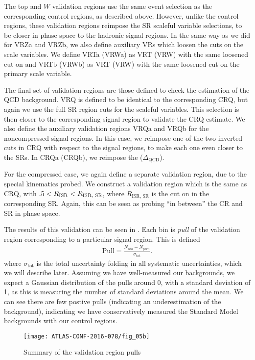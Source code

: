 The top and $W$ validation regions use the same event selection as the corresponding control regions, as described above.
However, unlike the control regions, these validation regions reimpose the SR scaleful variable selections, to be closer in phase space to the hadronic signal regions.
In the same way as we did for VRZa and VRZb, we also define auxiliary VRs which loosen the cuts on the scale variables.
We define VRTa (VRWa) as VRT (VRW) with the same loosened cut on  and VRTb (VRWb) as VRT (VRW) with the same loosened cut on the primary scale variable.

The final set of validation regions are those defined to check the estimation of the QCD background.
VRQ is defined to be identical to the corresponding CRQ, but again we use the full SR region cuts for the scaleful variables.
This selection is then closer to the corresponding signal region to validate the CRQ estimate.
We also define the auxiliary validation regions VRQa and VRQb for the noncompressed signal regions.
In this case, we reimpose one of the two inverted cuts in CRQ with respect to the signal regions, to make each one even closer to the SRs.
In CRQa (CRQb), we reimpose the  ($\Delta_{\mathrm{QCD}}$).

For the compressed case, we again define a separate validation region, due to the special kinematics probed.
We construct a validation region which is the same as CRQ, with $.5 < R_{\text{ISR}} < R_{\text{ISR, SR}}$, where $R_{\text{ISR, SR}}$ is the cut on \risr in the corresponding SR.
Again, this can be seen as probing ``in between'' the CR and SR in phase space.

The results of this validation can be seen in .
Each bin is \textit{pull} of the validation region corresponding to a particular signal region.
This is defined
\begin{align}
\text{Pull} = \frac{N_{\mathrm{obs}} - N_{\mathrm{pred}}}{\sigma_{\mathrm{tot}}}.
\end{align}
where $\sigma_{\mathrm{tot}}$ is the total uncertainty folding in all systematic uncertainties, which we will describe later.
Assuming we have well-measured our backgrounds, we expect a Gaussian distribution of the pulls around 0, with a standard deviation of 1, as this is measuring the number of standard deviations around the mean.
We can see there are few postive pulls (indicating an underestimation of the background), indicating we have conservatively measured the Standard Model backgrounds with our control regions.
\begin{figure}
\caption{Summary of the validation region pulls} \label{fig:vr_summary}
\texttt{[image: ATLAS-CONF-2016-078/fig\_05b]}
\end{figure}

